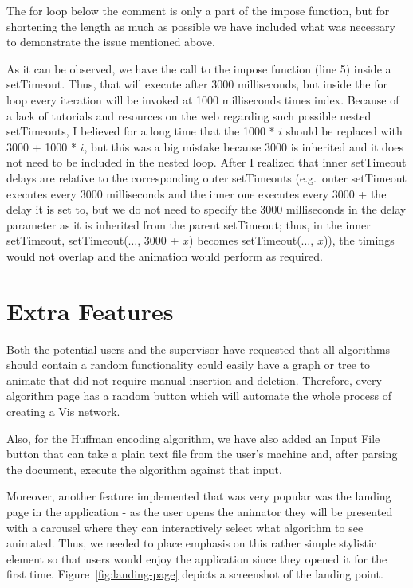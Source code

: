 \documentclass{l4proj}
\begin{document}
The for loop below the comment is only a part of the impose function, but for shortening the length as much as possible
we have included what was necessary to demonstrate the issue mentioned above. 

As it can be observed, we have the call to the impose function (line 5) inside a setTimeout. Thus, that will execute
after 3000 milliseconds, but inside the for loop every iteration will be invoked at 1000 milliseconds times index.
Because of a lack of tutorials and resources on the web regarding such possible nested setTimeouts, I believed for a
long time that the 1000 * $i$ should be replaced with 3000 + 1000 * $i$, but this was a big mistake because 3000 is
inherited and it does not need to be included in the nested loop. After I realized that inner setTimeout delays are
relative to the corresponding outer setTimeouts (e.g.\ outer setTimeout executes every 3000 milliseconds and the inner
one executes every 3000 + the delay it is set to, but we do not need to specify the 3000 milliseconds in the delay
parameter as it is
inherited from the parent setTimeout; thus, in the inner setTimeout, setTimeout({$\dots$}, 3000 + $x$) becomes
setTimeout({$\dots$}, $x$)), the timings would not overlap
and the animation would perform as required.

\section{Extra Features}

Both the potential users and the supervisor have requested that all algorithms should contain a random functionality
could easily have a graph or tree to animate that did not require manual insertion and deletion. Therefore, every
algorithm page has a random button which will automate the whole process of creating a Vis network.

Also, for the Huffman encoding algorithm, we have also added an Input File button that can take a plain text file from
the user's machine and, after parsing the document, execute the algorithm against that input. 

Moreover, another feature implemented that was very popular was the landing page in the application - as
the user opens the animator they will be presented with a carousel where they can interactively select what algorithm
to see animated. Thus, we needed to place emphasis on this rather simple stylistic element so that users would enjoy
the application since they opened it for the first time. Figure~\ref{fig:landing-page} depicts a screenshot of the landing point.
\end{document}
